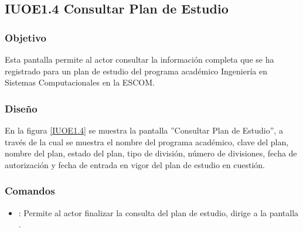 \subsection{IUOE1.4 Consultar Plan de Estudio}

\subsubsection{Objetivo}
	Esta pantalla permite al actor consultar la información completa que se ha registrado para un plan de estudio del programa académico Ingeniería en Sistemas Computacionales en la ESCOM.

\subsubsection{Diseño}
	En la figura \ref{IUOE1.4} se muestra la pantalla ''Consultar Plan de Estudio'', a través de la cual se muestra el nombre del programa académico, clave del plan, nombre del plan, estado del plan, tipo de división, número de divisiones, fecha de autorización y fecha de entrada en vigor del plan de estudio en cuestión.


\subsubsection{Comandos}
\begin{itemize}
	\item {}: Permite al actor finalizar la consulta del plan de estudio, dirige a la pantalla .

\end{itemize}
